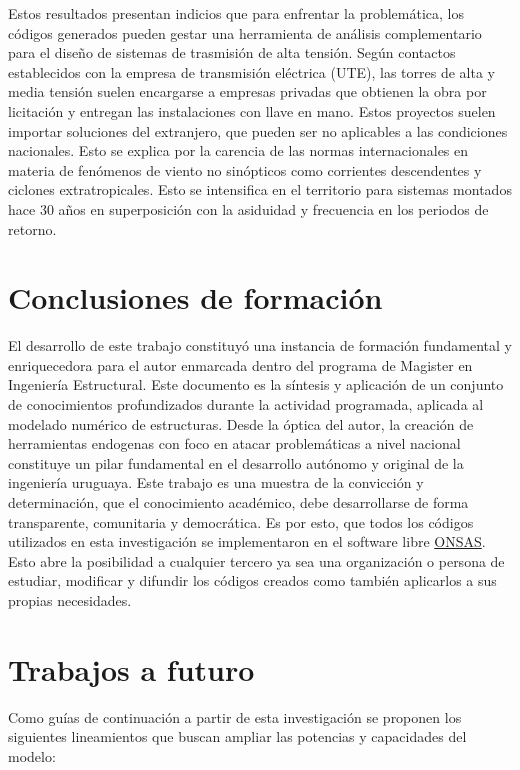 Estos resultados presentan indicios que para enfrentar la problemática, los códigos generados pueden gestar una herramienta de análisis complementario para el diseño de sistemas de trasmisión de alta tensión. Según contactos establecidos con la empresa de transmisión eléctrica (UTE), las torres de alta y media tensión suelen encargarse a empresas privadas que obtienen la obra por licitación y entregan las instalaciones con llave en mano. Estos proyectos suelen importar soluciones del extranjero, que pueden ser no aplicables a las condiciones nacionales. Esto se explica por la carencia de las normas internacionales en materia de fenómenos de viento no sinópticos como corrientes descendentes y ciclones extratropicales. Esto se intensifica en el territorio para sistemas montados hace 30 años en superposición con la asiduidad y frecuencia en los periodos de retorno. 

\section{Conclusiones de formación}
El desarrollo de este trabajo constituyó una instancia de formación fundamental y enriquecedora para el autor enmarcada dentro del programa de Magister en Ingeniería Estructural. Este documento es la síntesis y aplicación de un conjunto de conocimientos profundizados durante la actividad programada, aplicada al modelado numérico de estructuras. Desde la óptica del autor, la creación de herramientas endogenas con foco en atacar problemáticas a nivel nacional constituye un pilar fundamental en el desarrollo autónomo y original de la ingeniería uruguaya. Este trabajo es una muestra de la convicción y determinación, que el conocimiento académico, debe desarrollarse de forma transparente, comunitaria y democrática. Es por esto, que todos los códigos utilizados en esta investigación se implementaron en el software libre \href{https://github.com/ONSAS/ONSAS/}{ONSAS}. Esto abre la posibilidad a cualquier tercero ya sea una organización o persona de estudiar, modificar y difundir los códigos creados como también aplicarlos a sus propias necesidades. 

\section{Trabajos a futuro}

Como guías de continuación a partir de esta investigación se proponen los siguientes lineamientos que buscan ampliar las potencias y capacidades del modelo:

